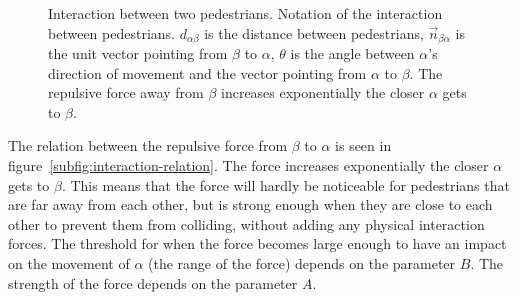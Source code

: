 \begin{figure}[h]
    \centering
    \caption[Interaction between two pedestrians]{Interaction between two 
    pedestrians.  Notation of the 
    interaction between pedestrians. $d_{\alpha \beta}$ is the distance 
    between pedestrians, $\overrightarrow{n}_{\beta \alpha}$ is the unit 
    vector pointing from $\beta$ to $\alpha$, $\theta$ is the angle between 
    $\alpha$'s direction of movement and the vector pointing from $\alpha$ to 
    $\beta$.  The repulsive force away 
    from $\beta$ increases exponentially the closer $\alpha$ gets to $\beta$.}
    \label{fig:pedestrian-interaction}
\end{figure}

The relation between the repulsive force from $\beta$ to $\alpha$ is seen in 
figure~\ref{subfig:interaction-relation}. The force increases exponentially 
the closer $\alpha$ gets to $\beta$. This means that the force will hardly be 
noticeable for pedestrians that are far away from each other, but is strong 
enough when they are close to each other to prevent them from colliding, 
without adding any physical interaction forces. The threshold for when the 
force becomes large enough to have an impact on the movement of $\alpha$ (the 
range of the force) depends on the parameter $B$. The strength of the force 
depends on the parameter $A$.

